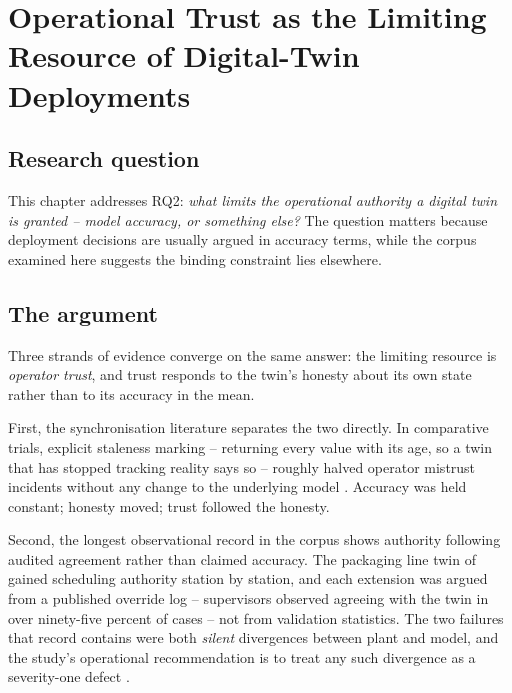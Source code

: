 \chapter{Operational Trust as the Limiting Resource of Digital-Twin Deployments}
\label{ch:trust}

\section{Research question}
\label{sec:trust-rq}

This chapter addresses RQ2: \emph{what limits the operational authority
a digital twin is granted -- model accuracy, or something else?} The
question matters because deployment decisions are usually argued in
accuracy terms, while the corpus examined here suggests the binding
constraint lies elsewhere.

\section{The argument}
\label{sec:trust-argument}

Three strands of evidence converge on the same answer: the limiting
resource is \emph{operator trust}, and trust responds to the twin's
honesty about its own state rather than to its accuracy in the mean.

First, the synchronisation literature separates the two directly. In
comparative trials, explicit staleness marking -- returning every value
with its age, so a twin that has stopped tracking reality says so --
roughly halved operator mistrust incidents without any change to the
underlying model \citep{sample_dt_sync_2023}. Accuracy was held
constant; honesty moved; trust followed the honesty.

Second, the longest observational record in the corpus shows authority
following audited agreement rather than claimed accuracy. The packaging
line twin of \citet{sample_dt_factory_2022} gained scheduling authority
station by station, and each extension was argued from a published
override log -- supervisors observed agreeing with the twin in over
ninety-five percent of cases -- not from validation statistics. The two
failures that record contains were both \emph{silent} divergences
between plant and model, and the study's operational recommendation is
to treat any such divergence as a severity-one defect
\citep{sample_dt_factory_2022}.

